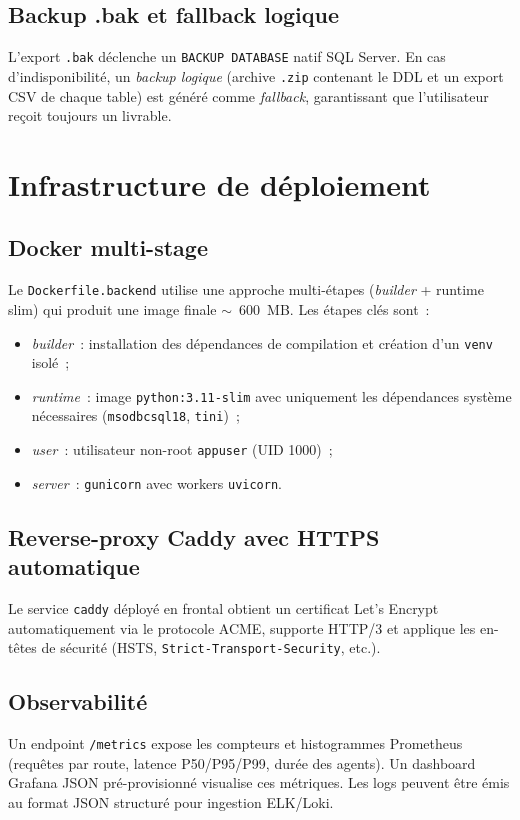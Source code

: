 \documentclass[12pt, a4paper]{report}
\begin{document}
\subsection{Backup .bak et fallback logique}
L'export \texttt{.bak} déclenche un \texttt{BACKUP DATABASE} natif
SQL Server. En cas d'indisponibilité, un \emph{backup logique}
(archive \texttt{.zip} contenant le \ac{DDL} et un export \ac{CSV}
de chaque table) est généré comme \emph{fallback}, garantissant
que l'utilisateur reçoit toujours un livrable.

\section{Infrastructure de déploiement}

\subsection{Docker multi-stage}
Le \texttt{Dockerfile.backend} utilise une approche multi-étapes
(\emph{builder} + runtime slim) qui produit une image finale
$\sim$~600~MB. Les étapes clés sont~:
\begin{itemize}
  \item \emph{builder}~: installation des dépendances de compilation
        et création d'un \texttt{venv} isolé~;
  \item \emph{runtime}~: image \texttt{python:3.11-slim} avec uniquement
        les dépendances système nécessaires
        (\texttt{msodbcsql18}, \texttt{tini})~;
  \item \emph{user}~: utilisateur non-root \texttt{appuser} (UID 1000)~;
  \item \emph{server}~: \texttt{gunicorn} avec workers \texttt{uvicorn}.
\end{itemize}

\subsection{Reverse-proxy Caddy avec HTTPS automatique}
Le service \texttt{caddy} déployé en frontal obtient un certificat
Let's Encrypt automatiquement via le protocole ACME, supporte
HTTP/3 et applique les en-têtes de sécurité (HSTS,
\texttt{Strict-Transport-Security}, etc.).

\subsection{Observabilité}
Un endpoint \texttt{/metrics} expose les compteurs et histogrammes
Prometheus (requêtes par route, latence P50/P95/P99, durée des
agents). Un dashboard Grafana JSON pré-provisionné visualise ces
métriques. Les logs peuvent être émis au format \ac{JSON} structuré
pour ingestion ELK/Loki.
\end{document}
